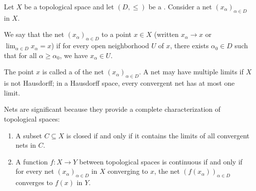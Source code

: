 \begin{definition} \label{definition:convergence_of_a_net_in_a_topological_space}

    Let $X$ be a topological space and let $(D, \leq)$ be a . Consider a net $(x_\alpha)_{\alpha \in D}$ in $X$.

    We say that the net $(x_\alpha)_{\alpha \in D}$  to a point $x \in X$ (written $x_\alpha \to x$ or $\lim_{\alpha \in D} x_\alpha = x$) if for every open neighborhood $U$ of $x$, there exists $\alpha_0 \in D$ such that for all $\alpha \geq \alpha_0$, we have $x_\alpha \in U$.

    The point $x$ is called a  of the net $(x_\alpha)_{\alpha \in D}$. A net may have multiple limits if $X$ is not Hausdorff; in a Hausdorff space, every convergent net has at most one limit.

    Nets are significant because they provide a complete characterization of topological spaces:
    \begin{enumerate}
        \item A subset $C \subseteq X$ is closed if and only if it contains the limits of all convergent nets in $C$.
        \item A function $f : X \to Y$ between topological spaces is continuous if and only if for every net $(x_\alpha)_{\alpha \in D}$ in $X$ converging to $x$, the net $(f(x_\alpha))_{\alpha \in D}$ converges to $f(x)$ in $Y$.
    \end{enumerate}
\end{definition}
